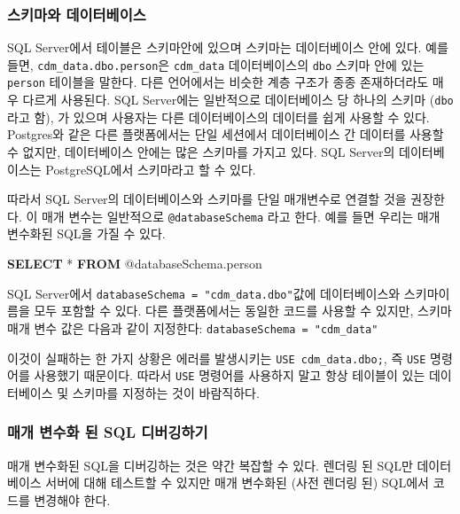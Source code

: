 \documentclass[11pt]{book}
\newenvironment{Shaded}{\begin{snugshade}}{\end{snugshade}}
\newcommand{\KeywordTok}[1]{\textcolor[rgb]{0.13,0.29,0.53}{\textbf{#1}}}
\newcommand{\NormalTok}[1]{#1}
\theoremstyle{definition}
\theoremstyle{definition}
\theoremstyle{definition}
\theoremstyle{remark}
\begin{document}
\subsubsection*{스키마와 데이터베이스}\label{-}

SQL Server에서 테이블은 스키마안에 있으며 스키마는 데이터베이스 안에
있다. 예를 들면, \texttt{cdm\_data.dbo.person}은 \texttt{cdm\_data}
데이터베이스의 \texttt{dbo} 스키마 안에 있는 \texttt{person} 테이블을
말한다. 다른 언어에서는 비슷한 계층 구조가 종종 존재하더라도 매우 다르게
사용된다. SQL Server에는 일반적으로 데이터베이스 당 하나의 스키마
(\texttt{dbo}라고 함), 가 있으며 사용자는 다른 데이터베이스의 데이터를
쉽게 사용할 수 있다. Postgres와 같은 다른 플랫폼에서는 단일 세션에서
데이터베이스 간 데이터를 사용할 수 없지만, 데이터베이스 안에는 많은
스키마를 가지고 있다. SQL Server의 데이터베이스는 PostgreSQL에서
스키마라고 할 수 있다.

따라서 SQL Server의 데이터베이스와 스키마를 단일 매개변수로 연결할 것을
권장한다. 이 매개 변수는 일반적으로 \texttt{@databaseSchema} 라고 한다.
예를 들면 우리는 매개 변수화된 SQL을 가질 수 있다.

\begin{Shaded}
\begin{Highlighting}[]
\KeywordTok{SELECT}\NormalTok{ * }\KeywordTok{FROM}\NormalTok{ @databaseSchema.person}
\end{Highlighting}
\end{Shaded}

SQL Server에서 \texttt{databaseSchema\ =\ "cdm\_data.dbo"}값에
데이터베이스와 스키마이름을 모두 포함할 수 있다. 다른 플랫폼에서는
동일한 코드를 사용할 수 있지만, 스키마 매개 변수 값은 다음과 같이
지정한다: \texttt{databaseSchema\ =\ "cdm\_data"}

이것이 실패하는 한 가지 상황은 에러를 발생시키는
\texttt{USE\ cdm\_data.dbo;}, 즉 \texttt{USE} 명령어를 사용했기
때문이다. 따라서 \texttt{USE} 명령어를 사용하지 말고 항상 테이블이 있는
데이터베이스 및 스키마를 지정하는 것이 바람직하다.

\subsubsection*{매개 변수화 된 SQL 디버깅하기}\label{---sql-}

매개 변수화된 SQL을 디버깅하는 것은 약간 복잡할 수 있다. 렌더링 된 SQL만
데이터베이스 서버에 대해 테스트할 수 있지만 매개 변수화된 (사전 렌더링
된) SQL에서 코드를 변경해야 한다. 
\end{document}
